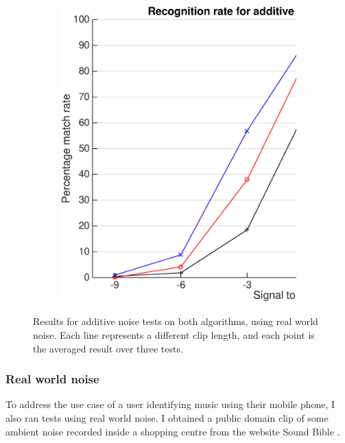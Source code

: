 \documentclass[12pt,a4paper,twoside,openright]{report}
\begin{document}
\begin{figure}[p]
    \begin{subfigure}{\textwidth}
      \includegraphics[width=\textwidth]{./figs/natural_shazam_results.eps} 
    \end{subfigure}

    \vspace{15mm}

    \caption{Results for additive noise tests on both algorithms, using real world noise. Each line represents a different clip length, and each point is the averaged result over three tests.}
    \label{fig:natural_results}
\end{figure}

\subsubsection{Real world noise}

To address the use case of a user identifying music using their mobile phone, I also ran tests using real world noise. I obtained a public domain clip of some ambient noise recorded inside a shopping centre from the website Sound Bible \cite{ShoppingAmbience}.
\end{document}
